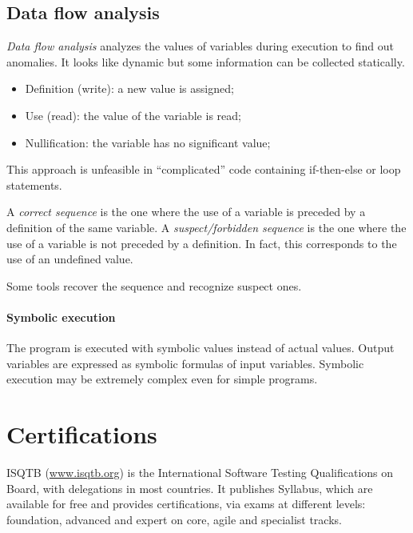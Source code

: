 \subsection{Data flow analysis}
\emph{Data flow analysis} analyzes the values of variables during execution to find out anomalies. It looks like dynamic but some information can be collected statically.
\begin{itemize}
\item Definition (write): a new value is assigned;
\item Use (read): the value of the variable is read;
\item Nullification: the variable has no significant value;
\end{itemize}
This approach is unfeasible in ``complicated'' code containing if-then-else or loop statements.

A \emph{correct sequence} is the one where the use of a variable is preceded by a definition of the same variable. A \emph{suspect/forbidden sequence} is the one where the use of a variable is not preceded by a definition. In fact, this corresponds to the use of an undefined value.

Some tools recover the sequence and recognize suspect ones.

\paragraph{Symbolic execution}
The program is executed with symbolic values instead of actual values. Output variables are expressed as symbolic formulas of input variables. Symbolic execution may be extremely complex even for simple programs.

\section{Certifications}
ISQTB (\href{www.isqtb.org}{www.isqtb.org}) is the International Software Testing Qualifications on Board, with delegations in most countries. It publishes Syllabus, which are available for free and provides certifications, via exams at different levels: foundation, advanced and expert on core, agile and specialist tracks.